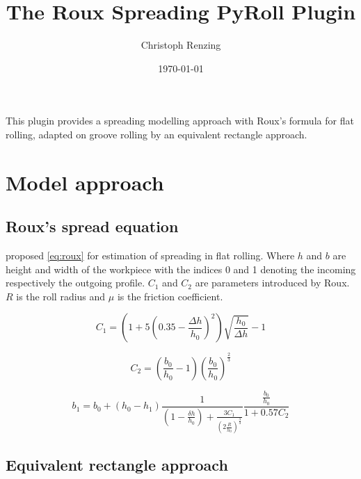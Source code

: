 \documentclass[11pt]{PyRollDocs}
\begin{document}
    \title{The Roux Spreading PyRoll Plugin}
    \author{Christoph Renzing}
    \date{\today}

    \maketitle

    This plugin provides a spreading modelling approach with Roux's formula for flat rolling, adapted on groove rolling by an equivalent rectangle approach.


    \section{Model approach}\label{sec:model-approach}

    \subsection{Roux's spread equation}\label{subsec:roux's-spread-equation}

    \textcite{} proposed \autoref{eq:roux} for estimation of spreading in flat rolling.
    Where $h$ and $b$ are height and width of the workpiece with the indices 0 and 1 denoting the incoming respectively the outgoing profile.
    $C_1$ and $C_2$ are parameters introduced by Roux.
    $R$ is the roll radius and $\mu$ is the friction coefficient.


    \begin{equation}
        C_1 = \left( 1 + 5 \left( 0.35 - \frac{\Delta h}{h_0}\right)^2 \right) \sqrt{\frac{h_0}{\Delta h}} -1
        \label{eq:roux-parameter-c1}
    \end{equation}

    \begin{equation}
        C_2 = \left( \frac{b_0}{h_0} - 1 \right) \left( \frac{b_0}{h_0} \right)^{\frac{2}{3}}
        \label{eq:roux-parameter-c2}
    \end{equation}

    \begin{equation}
        b_1 = b_0 + \left( h_0 - h_1 \right) \frac{1}{\left( 1 - \frac{\delta h}{h_0} \right) + \frac{3 C_1}{\left( 2 \frac{R}{h_0} \right)^{\frac{3}{4}}}} \frac{\frac{b_0}{h_0}}{1 + 0.57 C_2}
        \label{eq:roux}
    \end{equation}

    \subsection{Equivalent rectangle approach}\label{subsec:equivalent-rectangle-approach}
\end{document}
